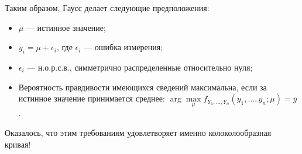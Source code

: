 \documentclass[a1paper, 14pt, portrait, 
               innermargin = 35mm, 
               blockverticalspace=0.25cm
               ]{tikzposter}
\begin{document}
{\begin{multicols}{3}
   Таким образом, {\selectfont Гаусс делает следующие предположения:}
    \begin{itemize}
    	\item $\mu$ --- истинное значение;
    	\item $y_i = \mu + \epsilon_i$, где $\epsilon_i$ --- ошибка измерения;
    	\item $\epsilon_i$ --- н.о.р.с.в., симметрично распределенные относительно нуля;
    	\item Вероятность правдивости имеющихся сведений максимальна, если за истинное значение принимается среднее: $\arg\max\limits_{\mu} f_{Y_1, \ldots, Y_n}(y_1, \ldots, y_n; \mu) = \bar{y}$ .
    \end{itemize}
    
    Оказалось, что этим требованиям удовлетворяет именно колоколообразная кривая!
\end{multicols}


}
\end{document}
